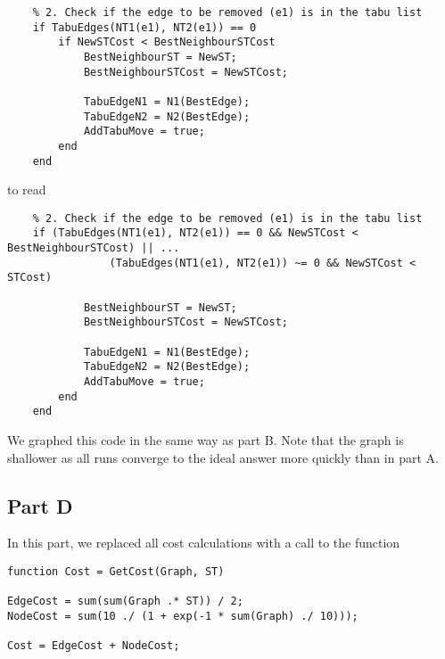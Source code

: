 \documentclass[a4paper]{article}
\begin{document}
\begin{verbatim}
    % 2. Check if the edge to be removed (e1) is in the tabu list
    if TabuEdges(NT1(e1), NT2(e1)) == 0
        if NewSTCost < BestNeighbourSTCost
            BestNeighbourST = NewST;
            BestNeighbourSTCost = NewSTCost;

            TabuEdgeN1 = N1(BestEdge);
            TabuEdgeN2 = N2(BestEdge);
            AddTabuMove = true;
        end
    end
\end{verbatim}

to read

\begin{verbatim}
    % 2. Check if the edge to be removed (e1) is in the tabu list
    if (TabuEdges(NT1(e1), NT2(e1)) == 0 && NewSTCost < BestNeighbourSTCost) || ...
                (TabuEdges(NT1(e1), NT2(e1)) ~= 0 && NewSTCost < STCost)

            BestNeighbourST = NewST;
            BestNeighbourSTCost = NewSTCost;

            TabuEdgeN1 = N1(BestEdge);
            TabuEdgeN2 = N2(BestEdge);
            AddTabuMove = true;
        end
    end
\end{verbatim}

We graphed this code in the same way as part B. Note that the graph is shallower as all runs converge to the ideal answer more quickly than in part A.



\subsection{Part D}


In this part, we replaced all cost calculations with a call to the function
\begin{verbatim}
function Cost = GetCost(Graph, ST)

EdgeCost = sum(sum(Graph .* ST)) / 2;
NodeCost = sum(10 ./ (1 + exp(-1 * sum(Graph) ./ 10)));

Cost = EdgeCost + NodeCost;
\end{verbatim}
\end{document}
